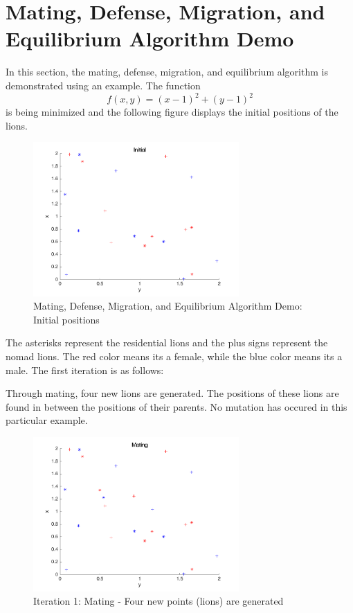 \section{Mating, Defense, Migration, and Equilibrium Algorithm Demo}
In this section, the mating, defense, migration, and equilibrium algorithm is demonstrated using an example. The function $$f(x,y)=(x-1)^2 + (y-1)^2$$ is being minimized and the following figure displays the initial positions of the lions.
\begin{figure}[H]
\begin{center}
\includegraphics[width=0.7\textwidth]{img/mdme/init}
\caption{Mating, Defense, Migration, and Equilibrium Algorithm Demo: Initial positions\cite{loa_2016}}
\end{center}
\end{figure}
The asterisks represent the residential lions and the plus signs represent the nomad lions. The red color means its a female, while the blue color means its a male. The first iteration is as follows:

Through mating, four new lions are generated. The positions of these lions are found in between the positions of their parents. No mutation has occured in this particular example.

\begin{figure}[H]
\begin{center}
\includegraphics[width=0.7\textwidth]{img/mdme/mating1}
\caption{Iteration 1: Mating - Four new points (lions) are generated}
\end{center}
\end{figure}


